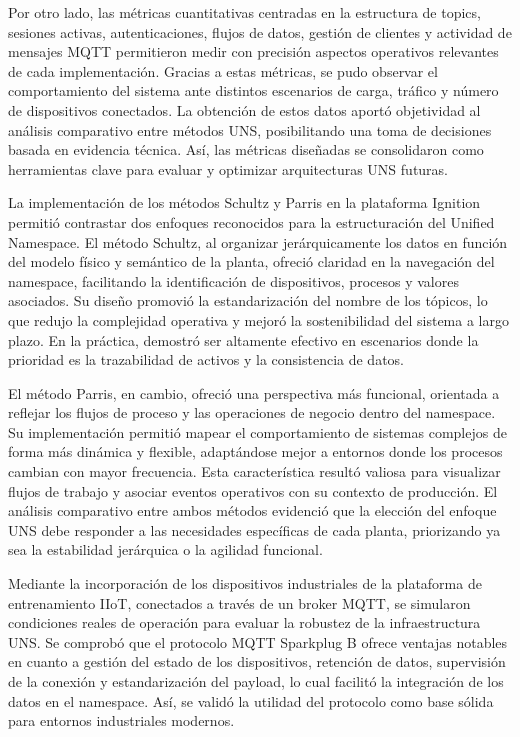 Por otro lado, las métricas cuantitativas centradas en la estructura de topics, sesiones activas, autenticaciones, flujos de datos, gestión de clientes y actividad de mensajes MQTT permitieron medir con precisión aspectos operativos relevantes de cada implementación. Gracias a estas métricas, se pudo observar el comportamiento del sistema ante distintos escenarios de carga, tráfico y número de dispositivos conectados. La obtención de estos datos aportó objetividad al análisis comparativo entre métodos UNS, posibilitando una toma de decisiones basada en evidencia técnica. Así, las métricas diseñadas se consolidaron como herramientas clave para evaluar y optimizar arquitecturas UNS futuras.




La implementación de los métodos Schultz y Parris en la plataforma Ignition permitió contrastar dos enfoques reconocidos para la estructuración del Unified Namespace. El método Schultz, al organizar jerárquicamente los datos en función del modelo físico y semántico de la planta, ofreció claridad en la navegación del namespace, facilitando la identificación de dispositivos, procesos y valores asociados. Su diseño promovió la estandarización del nombre de los tópicos, lo que redujo la complejidad operativa y mejoró la sostenibilidad del sistema a largo plazo. En la práctica, demostró ser altamente efectivo en escenarios donde la prioridad es la trazabilidad de activos y la consistencia de datos.

El método Parris, en cambio, ofreció una perspectiva más funcional, orientada a reflejar los flujos de proceso y las operaciones de negocio dentro del namespace. Su implementación permitió mapear el comportamiento de sistemas complejos de forma más dinámica y flexible, adaptándose mejor a entornos donde los procesos cambian con mayor frecuencia. Esta característica resultó valiosa para visualizar flujos de trabajo y asociar eventos operativos con su contexto de producción. El análisis comparativo entre ambos métodos evidenció que la elección del enfoque UNS debe responder a las necesidades específicas de cada planta, priorizando ya sea la estabilidad jerárquica o la agilidad funcional.


Mediante la incorporación de los dispositivos industriales de la plataforma de entrenamiento IIoT, conectados a través de un broker MQTT, se simularon condiciones reales de operación para evaluar la robustez de la infraestructura UNS. Se comprobó que el protocolo MQTT Sparkplug B ofrece ventajas notables en cuanto a gestión del estado de los dispositivos, retención de datos, supervisión de la conexión y estandarización del payload, lo cual facilitó la integración de los datos en el namespace. Así, se validó la utilidad del protocolo como base sólida para entornos industriales modernos.

